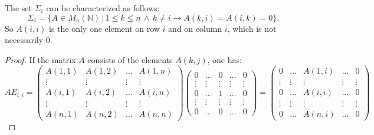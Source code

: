 \documentclass[10pt,a4paper]{amsart}
\begin{document}
\begin{lemma}\label{lemmasigmai}
The set $\Sigma_i$ can be characterized as follows:
$$\Sigma_i = \{ A \in M_n(\mathbb N) \,|\,1 \leq k \leq n \,\wedge \, k \neq i \rightarrow A(k,i) = A(i,k) = 0 \}.$$ 
So $A(i,i)$ is the only one element on row $i$ and on column $i$, which is not necessarily $0$. 
\end{lemma}

\begin{proof} If the matrix $A$ consists of the elements $A(k,j)$, one has:
$$ A E_{i,i} = 
\begin{pmatrix}
A(1,1) & A(1,2) & \dots & A(1,n) \\
\vdots & \vdots & \vdots & \vdots \\
A(i,1) & A(i,2) & \dots & A(i,n) \\
\vdots & \vdots & \vdots & \vdots \\
A(n,1) & A(n,2) & \dots & A(n,n) 
\end{pmatrix}
\begin{pmatrix}
0 & \dots & 0 & \dots & 0\\
\vdots & \vdots & \vdots & \vdots & \vdots \\
0 & \dots &1 & \dots & 0\\
\vdots & \vdots & \vdots & \vdots & \vdots \\
0 & \dots & 0 & \dots & 0
\end{pmatrix} = 
\begin{pmatrix}
0 & \dots & A(1,i) & \dots & 0\\
\vdots & \vdots & \vdots & \vdots & \vdots\\
0 & \dots &A(i,i) & \dots & 0\\
\vdots & \vdots & \vdots & \vdots & \vdots \\
0 & \dots & A(n,i) & \dots & 0
\end{pmatrix}
$$


\end{proof}
\end{document}
